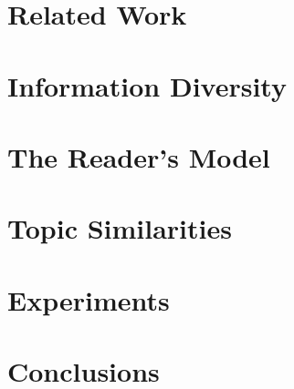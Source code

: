 \documentclass{article}
\begin{document}

\section{Related Work}
\label{sec:related-work}


\section{Information Diversity}
\label{sec:information-diversity}




\section{The Reader's Model}
\label{sec:the-readers-model}


\section{Topic Similarities}
\label{sec:topic-similarities}



\section{Experiments}
\label{sec:experiments}


\section{Conclusions}
\label{sec:conclusions}













\end{document}
